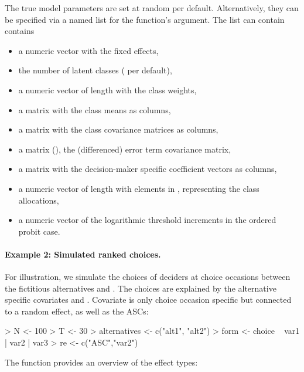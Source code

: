 \documentclass[article,shortnames]{jss}
\newcommand{\fct}[1]{\code{#1()}}
\begin{document}
The true model parameters are set at random per default. Alternatively, they can be specified via a named list for the function's  argument. The list can contain contains
\begin{itemize}
  \item a numeric vector  with the fixed effects,
  \item the number  of latent classes ( per default),
  \item a numeric vector  of length  with the class weights,
  \item a matrix  with the class means as columns,
  \item a matrix  with the class covariance matrices as columns,
  \item a matrix  (), the (differenced) error term covariance matrix,
  \item a matrix  with the decision-maker specific coefficient vectors as columns,
  \item a numeric vector  of length  with elements in , representing the class allocations,
  \item a numeric vector  of the logarithmic threshold increments in the ordered probit case.
\end{itemize}

\paragraph{Example 2: Simulated ranked choices.}
For illustration, we simulate the choices of  deciders at  choice occasions between the fictitious alternatives  and . The choices are explained by the alternative specific covariates  and . Covariate  is only choice occasion specific but connected to a random effect, as well as the ASCs:

\begin{Schunk}
\begin{Sinput}
> N <- 100
> T <- 30
> alternatives <- c("alt1", "alt2")
> form <- choice ~ var1 | var2 | var3
> re <- c("ASC","var2")
\end{Sinput}
\end{Schunk}

The \fct{overview\_effects} function provides an overview of the effect types:
\end{document}
